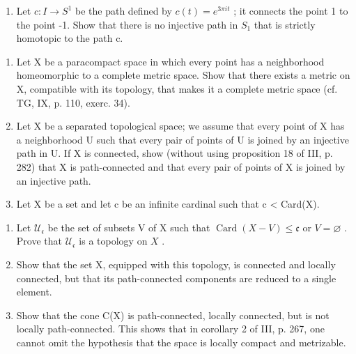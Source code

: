 \begin{enumerate}
\def\labelenumi{\alph{enumi})}
\setcounter{enumi}{1}
\tightlist
\item
  Let \(c: I \to S^{1}\) be the path defined by \(c(t) = e^{3\pi it}\) ; it connects the point 1 to the point -1. Show that there is no injective path in \(S_{1}\) that is strictly homotopic to the path c.
\end{enumerate}

\begin{enumerate}
\def\labelenumi{\arabic{enumi})}
\setcounter{enumi}{11}
\item
  Let X be a paracompact space in which every point has a neighborhood homeomorphic to a complete metric space. Show that there exists a metric on X, compatible with its topology, that makes it a complete metric space (cf. TG, IX, p. 110, exerc. 34).
\item
  Let X be a separated topological space; we assume that every point of X has a neighborhood U such that every pair of points of U is joined by an injective path in U. If X is connected, show (without using proposition 18 of III, p. 282) that X is path-connected and that every pair of points of X is joined by an injective path.
\item
  Let X be a set and let c be an infinite cardinal such that c \textless{} Card(X).
\end{enumerate}

\begin{enumerate}
\def\labelenumi{\alph{enumi})}
\item
  Let \(\mathcal{U}_{\mathfrak{c}}\) be the set of subsets V of X such that \(\operatorname{Card}(X - V) \leqslant \mathfrak{c}\) or \(V = \varnothing\) . Prove that \(\mathcal{U}_{\mathfrak{c}}\) is a topology on \(X\) .
\item
  Show that the set X, equipped with this topology, is connected and locally connected, but that its path-connected components are reduced to a single element.
\item
  Show that the cone C(X) is path-connected, locally connected, but is not locally path-connected. This shows that in corollary 2 of III, p. 267, one cannot omit the hypothesis that the space is locally compact and metrizable.
\end{enumerate}

